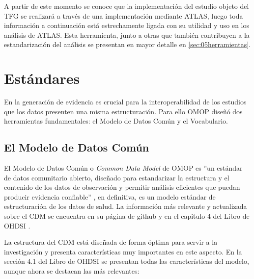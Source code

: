 A partir de este momento se conoce que la implementación del estudio objeto del TFG se realizará a través de una implementación mediante ATLAS, luego toda información a continuación está estrechamente ligada con su utilidad y uso en los análisis de ATLAS. Esta herramienta, junto a otras que también contribuyen a la estandarización del análisis se presentan en mayor detalle en \ref{sec:05herramientas}.

\section{Estándares}


En la generación de evidencia es crucial para la interoperabilidad de los estudios que los datos presenten una misma estructuración. Para ello OMOP diseñó dos herramientas fundamentales: el Modelo de Datos Común y el Vocabulario.

\subsection{El Modelo de Datos Común}

El Modelo de Datos Común o \textit{Common Data Model} de OMOP es ''un estándar de datos comunitario abierto, diseñado para estandarizar la estructura y el contenido de los datos de observación y permitir análisis eficientes que puedan producir evidencia confiable'' \cite{gitPagesCMD}, en definitiva, es un modelo estándar de estructuración de los datos de salud. La información más relevante y actualizada sobre el CDM se encuentra en su página de github \cite{gitPagesCMD} y en el capitulo 4 del Libro de OHDSI \cite{OHDSIbook}.

La estructura del CDM está diseñada de forma óptima para servir a la investigación y presenta características muy importantes en este aspecto. En la sección 4.1 del Libro de OHDSI se presentan todas las características del modelo, aunque ahora se destacan las más relevantes:

